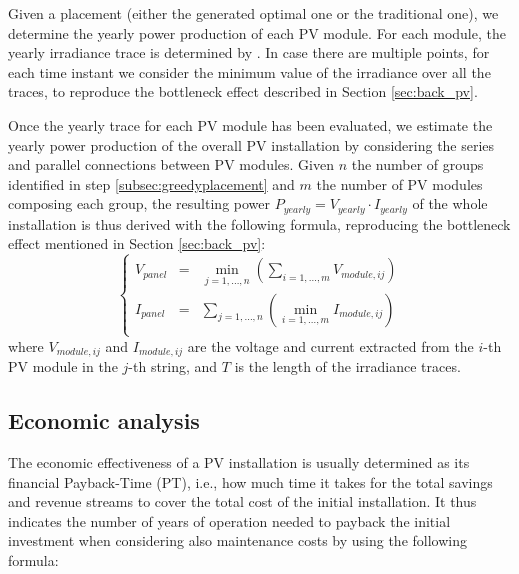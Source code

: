 Given a placement (either the generated optimal one or the traditional one), we determine the yearly power production of each PV module. For each module, the yearly irradiance trace is determined by . In case there are multiple points, for each time instant we consider the minimum value of the irradiance over all the traces, to reproduce the bottleneck effect described in Section \ref{sec:back_pv}. %

Once the yearly trace for each PV module has been evaluated, we estimate the yearly power production of the overall PV installation by considering the series and parallel connections between PV modules. Given $n$ the number of groups identified in step \ref{subsec:greedyplacement} and $m$ the number of PV modules composing each group, the resulting power $P_{yearly} = V_{yearly} \cdot I_{yearly}$ of the whole installation is thus derived with the following formula, reproducing the bottleneck effect mentioned in Section \ref{sec:back_pv}:
\[  \left\{
		\begin{array}{rcl}
V_{panel} & = & \min_{j=1,\dots,n} (\sum_{i=1,\dots,m} V_{module,ij})\\
I_{panel} & = & \sum_{j=1,\dots,n} (\min_{i=1,\dots,m} I_{module,ij})\\
\end{array}
\right.
\]
where $V_{module,ij}$ and $I_{module,ij}$ are the
voltage and current extracted from the $i$-th PV module in the $j$-th string, and $T$ is the length of the irradiance traces. 

\subsection{Economic analysis}
\label{sec:economic}
The economic effectiveness of a PV installation is usually determined as its financial Payback-Time (PT), i.e., how much time it takes for the total savings and revenue streams to cover the total cost of the initial installation. %
It thus indicates the number of years of operation needed to payback the initial investment when considering also maintenance costs by using the following formula:

